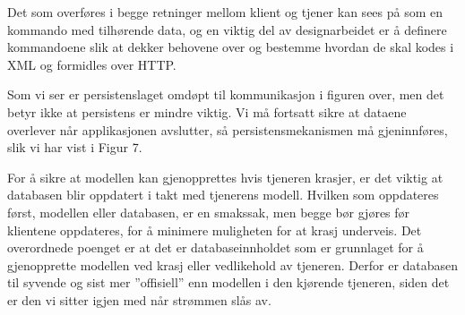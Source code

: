 \documentclass[a4paper]{scrartcl}
\begin{document}
Det som overføres i begge retninger mellom klient og tjener kan sees på som en kommando med tilhørende data, og en viktig del av designarbeidet er å definere kommandoene slik at dekker behovene over og bestemme hvordan de skal kodes i XML og formidles over HTTP.

Som vi ser er persistenslaget omdøpt til kommunikasjon i figuren over, men det betyr ikke at persistens er mindre viktig. Vi må fortsatt sikre at dataene overlever når applikasjonen avslutter, så persistensmekanismen må gjeninnføres, slik vi har vist i Figur 7.

For å sikre at modellen kan gjenopprettes hvis tjeneren krasjer, er det viktig at databasen blir oppdatert i takt med tjenerens modell. Hvilken som oppdateres først, modellen eller databasen, er en smakssak, men begge bør gjøres før klientene oppdateres, for å minimere muligheten for at krasj underveis. Det overordnede poenget er at det er databaseinnholdet som er grunnlaget for å gjenopprette modellen ved krasj eller vedlikehold av tjeneren. Derfor er databasen til syvende og sist mer ”offisiell” enn modellen i den kjørende tjeneren, siden det er den vi sitter igjen med når strømmen slås av.
\end{document}
